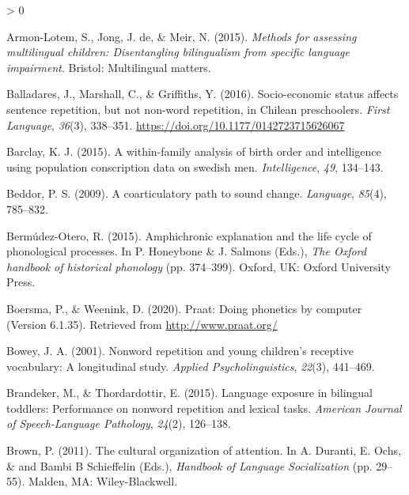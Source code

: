 \documentclass[
  american,
  ,man,floatsintext]{apa6}
\newlength{\cslhangindent}
\newenvironment{CSLReferences}[2] %
 {%
  \setlength{\parindent}{0pt}
  \ifodd #1 \everypar{\setlength{\hangindent}{\cslhangindent}}\ignorespaces\fi
  \ifnum #2 > 0
  \setlength{\parskip}{#2\baselineskip}
  \fi
 }%
 {}
\begin{document}
\hypertarget{refs}{}
\begin{CSLReferences}{1}{0}
\leavevmode\hypertarget{ref-armon2015assessing}{}%
Armon-Lotem, S., Jong, J. de, \& Meir, N. (2015). \emph{Methods for assessing multilingual children: Disentangling bilingualism from specific language impairment}. Bristol: Multilingual matters.

\leavevmode\hypertarget{ref-balladares2016socio}{}%
Balladares, J., Marshall, C., \& Griffiths, Y. (2016). {Socio-economic status affects sentence repetition, but not non-word repetition, in Chilean preschoolers}. \emph{{First Language}}, \emph{36}(3), 338--351. \url{https://doi.org/10.1177/0142723715626067}

\leavevmode\hypertarget{ref-barclay2015within}{}%
Barclay, K. J. (2015). A within-family analysis of birth order and intelligence using population conscription data on swedish men. \emph{Intelligence}, \emph{49}, 134--143.

\leavevmode\hypertarget{ref-beddor2009coarticulatory}{}%
Beddor, P. S. (2009). A coarticulatory path to sound change. \emph{Language}, \emph{85}(4), 785--832.

\leavevmode\hypertarget{ref-bermudezotero2015amphichronic}{}%
Bermúdez-Otero, R. (2015). Amphichronic explanation and the life cycle of phonological processes. In P. Honeybone \& J. Salmons (Eds.), \emph{The {O}xford handbook of historical phonology} (pp. 374--399). Oxford, UK: Oxford University Press.

\leavevmode\hypertarget{ref-Praat}{}%
Boersma, P., \& Weenink, D. (2020). Praat: Doing phonetics by computer (Version 6.1.35). Retrieved from \url{http://www.praat.org/}

\leavevmode\hypertarget{ref-bowey2001nonword}{}%
Bowey, J. A. (2001). Nonword repetition and young children's receptive vocabulary: A longitudinal study. \emph{Applied Psycholinguistics}, \emph{22}(3), 441--469.

\leavevmode\hypertarget{ref-brandeker2015language}{}%
Brandeker, M., \& Thordardottir, E. (2015). Language exposure in bilingual toddlers: Performance on nonword repetition and lexical tasks. \emph{American Journal of Speech-Language Pathology}, \emph{24}(2), 126--138.

\leavevmode\hypertarget{ref-brown2011cultural}{}%
Brown, P. (2011). The cultural organization of attention. In A. Duranti, E. Ochs, \& and Bambi B Schieffelin (Eds.), \emph{Handbook of {Language Socialization}} (pp. 29--55). Malden, MA: Wiley-Blackwell.


\end{CSLReferences}
\end{document}
